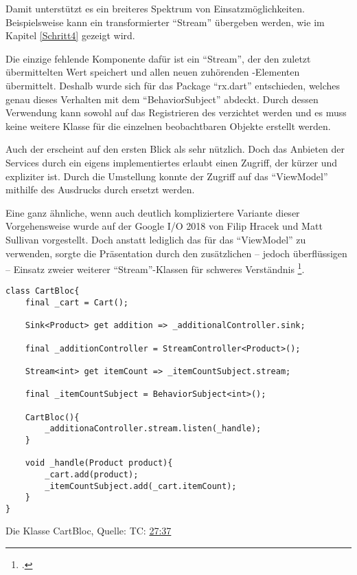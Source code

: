 Damit unterstützt es ein breiteres Spektrum von Einsatzmöglichkeiten.
Beispielsweise kann ein transformierter \enquote{Stream} übergeben werden, wie im Kapitel \ref{Schritt4} gezeigt wird.

Die einzige fehlende Komponente dafür ist ein \enquote{Stream},
der den zuletzt übermittelten Wert speichert und allen neuen zuhörenden -Elementen übermittelt.
Deshalb wurde sich für das Package \enquote{rx.dart} entschieden,
welches genau dieses Verhalten mit dem \enquote{BehaviorSubject} abdeckt.
Durch dessen Verwendung kann sowohl auf das Registrieren des  verzichtet werden
und es muss keine weitere Klasse für die einzelnen beobachtbaren Objekte erstellt werden.

Auch der  erscheint auf den ersten Blick als sehr nützlich.
Doch das Anbieten der Services durch ein eigens implementiertes  erlaubt einen Zugriff,
der kürzer und expliziter ist.
Durch die Umstellung konnte der Zugriff auf das \enquote{ViewModel} mithilfe des Ausdrucks  durch  ersetzt werden.

Eine ganz ähnliche, wenn auch deutlich kompliziertere Variante dieser Vorgehensweise wurde auf der Google I/O 2018 von Filip Hracek und Matt Sullivan vorgestellt.
Doch anstatt lediglich das  für das \enquote{ViewModel} zu verwenden,
sorgte die Präsentation durch den zusätzlichen -- jedoch überflüssigen -- Einsatz zweier weiterer \enquote{Stream}-Klassen für schweres Verständnis \Lst{\ref{lst:CartBloc}}\footcite[][TC: \href{https://youtu.be/RS36gBEp8OI?t=1657}{27:37}]{GoogleIO18}.

\ifIncludeFigures
  \begin{listing}[h]
    \begin{verbatim}
class CartBloc{
    final _cart = Cart();

    Sink<Product> get addition => _additionalController.sink;

    final _additionController = StreamController<Product>();

    Stream<int> get itemCount => _itemCountSubject.stream;

    final _itemCountSubject = BehaviorSubject<int>();

    CartBloc(){
        _additionaController.stream.listen(_handle);
    }

    void _handle(Product product){
        _cart.add(product);
        _itemCountSubject.add(_cart.itemCount);
    }
}
\end{verbatim}
    \caption[Die Klasse CartBloc]{Die Klasse CartBloc, Quelle: \cite{GoogleIO18} TC: \href{https://youtu.be/RS36gBEp8OI?t=1657}{27:37}}
    \label{lst:CartBloc}
  \end{listing}
\fi

